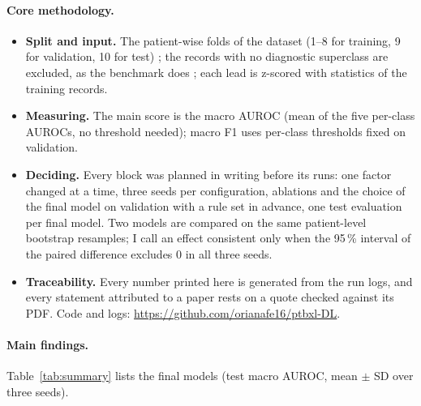 \paragraph{Core methodology.}
\begin{itemize}[leftmargin=1.2em,itemsep=1pt,topsep=2pt]
  \item \textbf{Split and input.} The patient-wise folds of the dataset (1--8 for training, 9 for
        validation, 10 for test) \cite{strodthoff2021deep}; the \edaNNosuperAll{} records with no
        diagnostic superclass are excluded, as the benchmark does \cite{strodthoff2021deep}; each lead is
        z-scored with statistics of the training records.
  \item \textbf{Measuring.} The main score is the macro AUROC (mean of the five per-class AUROCs, no
        threshold needed); macro F1 uses per-class thresholds fixed on validation.
  \item \textbf{Deciding.} Every block was planned in writing before its runs: one factor changed at a
        time, three seeds per configuration, ablations and the choice of the final model on validation
        with a rule set in advance, one test evaluation per final model. Two models are compared on the
        same patient-level bootstrap resamples; I call an effect consistent only when the 95\,\%
        interval of the paired difference excludes 0 in all three seeds.
  \item \textbf{Traceability.} Every number printed here is generated from the run logs, and every
        statement attributed to a paper rests on a quote checked against its PDF. Code and logs:
        \url{https://github.com/orianafe16/ptbxl-DL}.
\end{itemize}

\paragraph{Main findings.} Table~\ref{tab:summary} lists the final models (test macro AUROC, mean
$\pm$ SD over three seeds).

